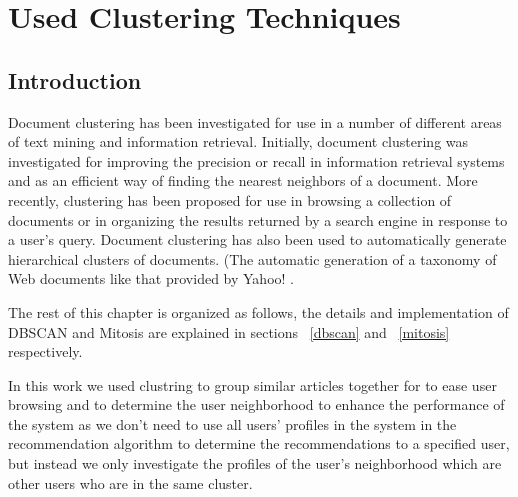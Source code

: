 
\chapter{Used Clustering Techniques} %

\label{clustering} %


\section{Introduction} \label{sec:intro}
Document clustering has been investigated for use in a number of different areas of text
mining and information retrieval. Initially, document clustering was investigated for improving
the precision or recall in information retrieval systems and as an efficient way of
finding the nearest neighbors of a document. More recently, clustering has been
proposed for use in browsing a collection of documents or in organizing the results
returned by a search engine in response to a user's query. Document clustering has
also been used to automatically generate hierarchical clusters of documents. (The
automatic generation of a taxonomy of Web documents like that provided by Yahoo! \citep{clustering_15}.

The rest of this chapter is organized as follows, the details and implementation of DBSCAN and Mitosis are explained in sections ~\ref{dbscan} and ~\ref{mitosis} respectively.


In this work we used clustring to group similar articles together for to ease user browsing and to determine the user neighborhood to enhance the performance of the system as we don't need to use all users' profiles in the system in the recommendation algorithm to determine the recommendations to a specified user, but instead we only investigate the profiles of the user's neighborhood which are other users who are in the same cluster.

